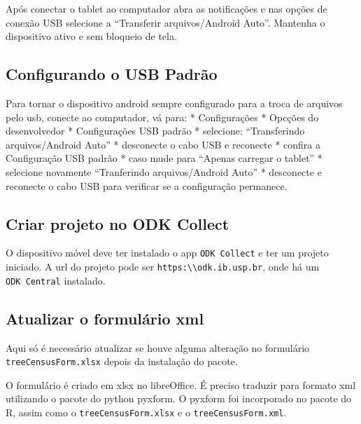 \documentclass[
  letterpaper,
]{report}
\begin{document}
Após conectar o tablet ao computador abra as notificações e nas opções
de conexão USB selecione a ``Transferir arquivos/Android Auto''.
Mantenha o dispositivo ativo e sem bloqueio de tela.

\subsection{Configurando o USB
Padrão}\label{configurando-o-usb-padruxe3o}

Para tornar o dispositivo android sempre configurado para a troca de
arquivos pelo usb, conecte ao computador, vá para: * Configurações *
Opcções do desenvolvedor * Configurações USB padrão * selecione:
``Transferindo arquivos/Android Auto'' * desconecte o cabo USB e
reconecte * confira a Configuração USB padrão * caso mude para ``Apenas
carregar o tablet'' * selecione novamente ``Tranferindo arquivos/Android
Auto'' * desconecte e reconecte o cabo USB para verificar se a
configuração permanece.

\subsection{Criar projeto no ODK
Collect}\label{criar-projeto-no-odk-collect}

O dispositivo móvel deve ter instalado o app \texttt{ODK\ Collect} e ter
um projeto iniciado. A url do projeto pode ser
\texttt{https:\textbackslash{}\textbackslash{}odk.ib.usp.br}, onde há um
\texttt{ODK\ Central} instalado.

\subsection{Atualizar o formulário
xml}\label{atualizar-o-formuluxe1rio-xml}

Aqui só é necessário atualizar se houve alguma alteração no formulário
\texttt{treeCensusForm.xlsx} depois da instalação do pacote.

O formulário é criado em xlsx no libreOffice. É preciso traduzir para
formato xml utilizando o pacote do python pyxform. O pyxform foi
incorporado no pacote do R, assim como o \texttt{treeCensusForm.xlsx} e
o \texttt{treeCensusForm.xml}.
\end{document}
